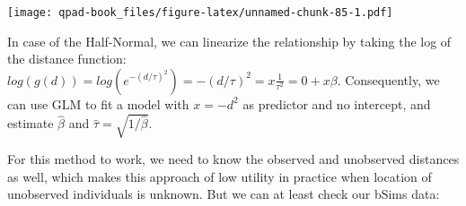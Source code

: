 \documentclass[12pt,]{book}
\newenvironment{Shaded}{\begin{snugshade}}{\end{snugshade}}
\newcommand{\ControlFlowTok}[1]{\textcolor[rgb]{0.13,0.29,0.53}{\textbf{#1}}}
\newcommand{\DataTypeTok}[1]{\textcolor[rgb]{0.13,0.29,0.53}{#1}}
\newcommand{\DecValTok}[1]{\textcolor[rgb]{0.00,0.00,0.81}{#1}}
\newcommand{\KeywordTok}[1]{\textcolor[rgb]{0.13,0.29,0.53}{\textbf{#1}}}
\newcommand{\NormalTok}[1]{#1}
\newcommand{\OperatorTok}[1]{\textcolor[rgb]{0.81,0.36,0.00}{\textbf{#1}}}
\newcommand{\OtherTok}[1]{\textcolor[rgb]{0.56,0.35,0.01}{#1}}
\newcommand{\StringTok}[1]{\textcolor[rgb]{0.31,0.60,0.02}{#1}}
\begin{document}
\begin{Shaded}
\end{Shaded}

\texttt{[image: qpad-book\_files/figure-latex/unnamed-chunk-85-1.pdf]}

In case of the Half-Normal, we can linearize the relationship
by taking the log of the distance function:
\(log(g(d)) =log(e^{-(d/\tau)^2})= -(d / \tau)^2 = x \frac{1}{\tau^2} = 0 + x \beta\).
Consequently, we can use GLM to fit a model with \(x = -d^2\) as
predictor and no intercept, and estimate \(\hat{\beta}\) and
\(\hat{\tau}=\sqrt{1/\hat{\beta}}\).

For this method to work, we need to know the observed and
unobserved distances as well,
which makes this approach of low utility in practice when
location of unobserved individuals is unknown.
But we can at least check our bSims data:

\begin{Shaded}
\end{Shaded}
\end{document}

